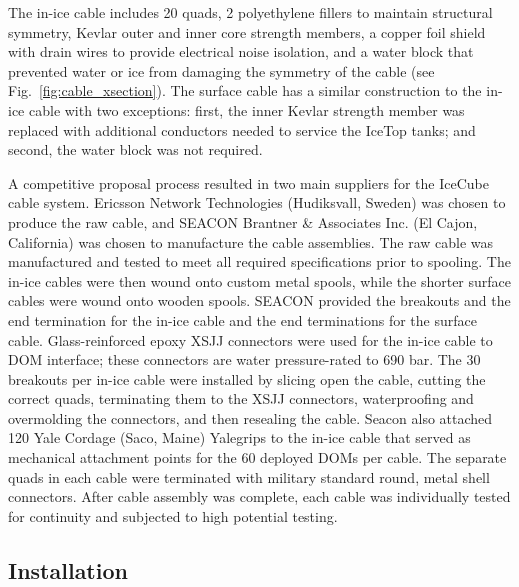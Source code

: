 The in-ice cable includes 20 quads, 2 polyethylene fillers to maintain structural
symmetry, Kevlar outer and inner core strength members, a copper foil
shield with drain wires to provide electrical noise isolation, and a water
block that prevented water or ice from damaging the symmetry of the
cable (see Fig.~\ref{fig:cable_xsection}). The surface cable has a similar
construction to the in-ice 
cable with two exceptions: first, the inner Kevlar strength member was replaced
with additional conductors needed to service the IceTop tanks; and second, the
water block was not required.

A competitive proposal process resulted in two main suppliers for the IceCube
cable system.  Ericsson Network Technologies (Hudiksvall, Sweden) was chosen
to produce the raw cable, and SEACON Brantner \& Associates Inc. (El Cajon,
California) was chosen to manufacture the cable assemblies. The raw
cable was manufactured and tested to meet all required specifications prior to spooling.  The in-ice cables were then
wound onto custom metal spools, while the shorter surface cables were wound
onto wooden spools. SEACON provided the breakouts
and the end termination for the in-ice cable and the end
terminations for the surface cable.  Glass-reinforced epoxy XSJJ
connectors were used for the in-ice
cable to DOM interface; these connectors are water pressure-rated to 690
bar. The 30 breakouts per in-ice cable were installed by 
slicing open the cable, cutting the correct quads, terminating them to the
XSJJ connectors, waterproofing and overmolding the connectors, and then
resealing the cable. Seacon also
attached 120 Yale Cordage (Saco, Maine) Yalegrips to the in-ice
cable that served as mechanical attachment points for the 60 deployed DOMs
per cable. The separate quads in each cable were terminated with
military standard round,
metal shell connectors. After cable assembly was complete, 
each cable was individually tested for continuity and subjected to high
potential testing. 

\subsection{Installation}

